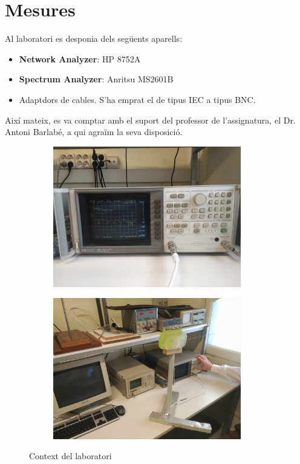 \section{Mesures}

Al laboratori es desponia dels següents aparells:
\begin{itemize}
\item \textbf{Network Analyzer}: HP 8752A
\item \textbf{Spectrum Analyzer}: Anritsu MS2601B
\item Adaptdors de cables. S'ha emprat el de tipus IEC a tipus BNC.
\end{itemize}

Així mateix, es va comptar amb el suport del professor de l'assignatura, el Dr. Antoni Barlabé, a qui agraïm la seva disposició.

\begin{figure}[H]
\centering
\begin{subfigure}{.5\textwidth}
	\centering
	\includegraphics[width=0.9\textwidth]{./images/Mesures/01setUp.jpg}
	\caption{}
	\label{setup1}
\end{subfigure}%
\begin{subfigure}{.5\textwidth}
	\centering
	\includegraphics[width=0.9\textwidth]{./images/Mesures/0setUp.jpg}
	\caption{}
	\label{setup2}
\end{subfigure}
\caption{Context del laboratori}
\label{setup}
\end{figure}

